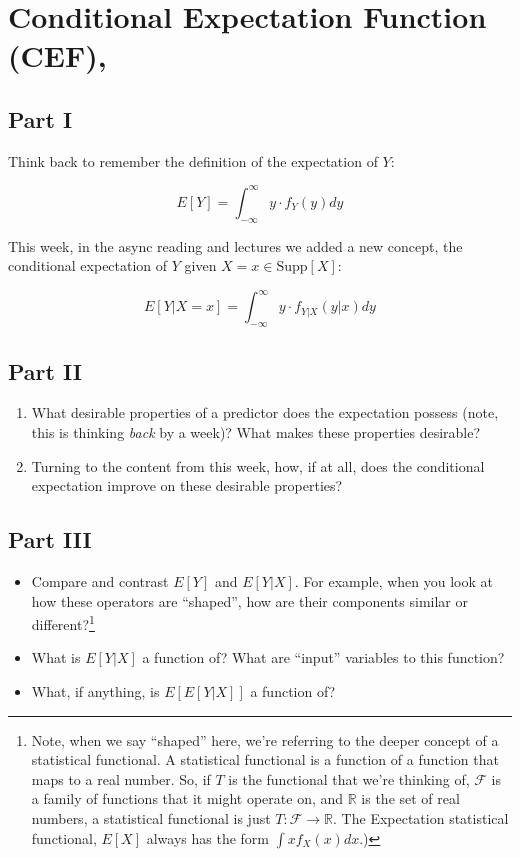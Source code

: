 \documentclass[
]{book}
\providecommand{\tightlist}{%
  \setlength{\itemsep}{0pt}\setlength{\parskip}{0pt}}
\theoremstyle{definition}
\theoremstyle{definition}
\theoremstyle{definition}
\theoremstyle{definition}
\theoremstyle{remark}
\begin{document}
\hypertarget{conditional-expectation-function-cef}{%
\section{Conditional Expectation Function (CEF),}\label{conditional-expectation-function-cef}}

\hypertarget{part-i}{%
\subsection{Part I}\label{part-i}}

Think back to remember the definition of the expectation of \(Y\):

\[
  E[Y] = \int_{-\infty}^\infty y \cdot f_{Y}(y) dy
\]

This week, in the async reading and lectures we added a new concept, the conditional expectation of \(Y\) given \(X=x \in \text{Supp}[X]\):

\[
  E[Y|X=x] =  \int_{-\infty}^\infty y \cdot f_{Y|X}(y|x) dy
\]

\hypertarget{part-ii}{%
\subsection{Part II}\label{part-ii}}

\begin{enumerate}
\def\labelenumi{\arabic{enumi}.}
\tightlist
\item
  What desirable properties of a predictor does the expectation possess (note, this is thinking \emph{back} by a week)? What makes these properties desirable?
\item
  Turning to the content from this week, how, if at all, does the conditional expectation improve on these desirable properties?
\end{enumerate}

\hypertarget{part-iii}{%
\subsection{Part III}\label{part-iii}}

\begin{itemize}
\item
  Compare and contrast \(E[Y]\) and \(E[Y|X]\). For example, when you look at how these operators are ``shaped'', how are their components similar or different?\footnote{Note, when we say ``shaped'' here, we're referring to the deeper concept of a statistical functional. A statistical functional is a function of a function that maps to a real number. So, if \(T\) is the functional that we're thinking of, \(\mathcal{F}\) is a family of functions that it might operate on, and \(\mathbb{R}\) is the set of real numbers, a statistical functional is just \(T: \mathcal{F} \rightarrow \mathbb{R}\). The Expectation statistical functional, \(E[X]\) always has the form \(\int x f_{X}(x)dx\).)}
\item
  What is \(E[Y|X]\) a function of? What are ``input'' variables to this function?
\item
  What, if anything, is \(E[E[Y|X]]\) a function of?
\end{itemize}
\end{document}
